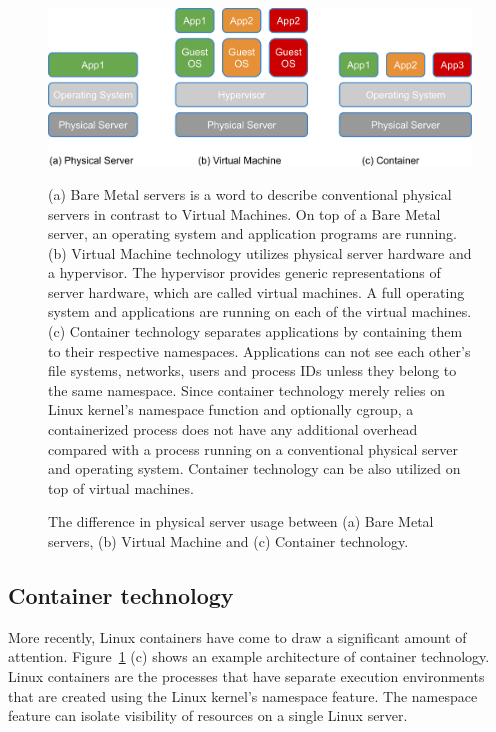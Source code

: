 \begin{figure}[h]
\begin{center}
\includegraphics[width=0.8\columnwidth]{Figs/physical_vm_container.png}
\end{center}
\caption{
The difference in physical server usage between (a) Bare Metal servers, (b) Virtual Machine and (c) Container technology.
}

(a) Bare Metal servers is a word to describe conventional physical servers in contrast to Virtual Machines.
On top of a Bare Metal server, an operating system and application programs are running.
(b) Virtual Machine technology utilizes physical server hardware and a hypervisor.
The hypervisor provides generic representations of server hardware, which are called virtual machines.
A full operating system and applications are running on each of the virtual machines.
(c) Container technology separates applications by containing them to their respective namespaces.
Applications can not see each other's file systems, networks, users and process IDs unless they belong to the same namespace.
Since container technology merely relies on Linux kernel's namespace function and optionally cgroup, a containerized process does not have any additional overhead compared with a process running on a conventional physical server and operating system.
Container technology can be also utilized on top of virtual machines.

\label{fig:physical_vm_container}
\end{figure}

\subsection{Container technology}

More recently, Linux containers\cite{menage2007adding} have come to draw a significant amount of attention.
Figure~\ref{fig:physical_vm_container} (c) shows an example architecture of container technology. 
Linux containers are the processes that have separate execution environments that are created using the Linux kernel's namespace feature.
The namespace feature can isolate visibility of resources on a single Linux server.

